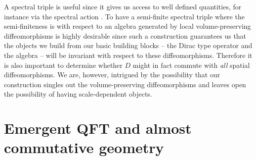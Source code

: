 \documentclass[12pt]{article}
\newcommand{\D}{\operatorname{D}}
\begin{document}
A spectral triple is useful since it gives us access to well defined quantities, for instance via the spectral action \cite{Chamseddine:1996rw,Chamseddine:1996zu}. 
To have a semi-finite spectral triple where the semi-finiteness is with respect to an algebra generated by local volume-preserving diffeomorphisms is highly desirable since such a construction guarantees us that the objects we build from our basic building blocks -- the Dirac type operator and the algebra -- will be invariant with respect to these diffeomorphisms. Therefore it is also important to determine whether $D$ might in fact commute with {\it all} spatial diffeomorphisms. We are, however, intrigued by the possibility that our construction singles out the volume-preserving diffeomorphisms and leaves open the possibility of having scale-dependent objects. 






















\section{Emergent QFT and almost commutative geometry}
\end{document}
